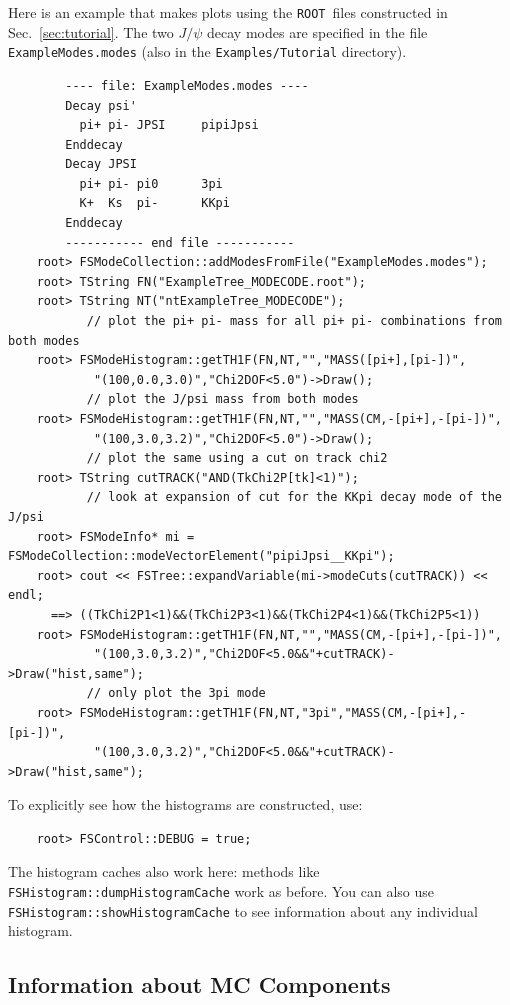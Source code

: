 \documentclass[11pt]{article}
\newcommand{\ROOT}{{\tt ROOT}}
\begin{document}
Here is an example that makes plots using the \ROOT\ files constructed in Sec.~\ref{sec:tutorial}.  The two $J/\psi$ decay modes are specified in the file {\tt ExampleModes.modes} (also in the {\tt Examples/Tutorial} directory).  
\begin{verbatim}
        ---- file: ExampleModes.modes ----
        Decay psi'
          pi+ pi- JPSI     pipiJpsi
        Enddecay
        Decay JPSI
          pi+ pi- pi0      3pi
          K+  Ks  pi-      KKpi
        Enddecay
        ----------- end file -----------
    root> FSModeCollection::addModesFromFile("ExampleModes.modes");
    root> TString FN("ExampleTree_MODECODE.root");  
    root> TString NT("ntExampleTree_MODECODE");
           // plot the pi+ pi- mass for all pi+ pi- combinations from both modes  
    root> FSModeHistogram::getTH1F(FN,NT,"","MASS([pi+],[pi-])",
            "(100,0.0,3.0)","Chi2DOF<5.0")->Draw();
           // plot the J/psi mass from both modes  
    root> FSModeHistogram::getTH1F(FN,NT,"","MASS(CM,-[pi+],-[pi-])",
            "(100,3.0,3.2)","Chi2DOF<5.0")->Draw();
           // plot the same using a cut on track chi2
    root> TString cutTRACK("AND(TkChi2P[tk]<1)");
           // look at expansion of cut for the KKpi decay mode of the J/psi
    root> FSModeInfo* mi = FSModeCollection::modeVectorElement("pipiJpsi__KKpi");
    root> cout << FSTree::expandVariable(mi->modeCuts(cutTRACK)) << endl;
      ==> ((TkChi2P1<1)&&(TkChi2P3<1)&&(TkChi2P4<1)&&(TkChi2P5<1))
    root> FSModeHistogram::getTH1F(FN,NT,"","MASS(CM,-[pi+],-[pi-])",
            "(100,3.0,3.2)","Chi2DOF<5.0&&"+cutTRACK)->Draw("hist,same");
           // only plot the 3pi mode
    root> FSModeHistogram::getTH1F(FN,NT,"3pi","MASS(CM,-[pi+],-[pi-])",
            "(100,3.0,3.2)","Chi2DOF<5.0&&"+cutTRACK)->Draw("hist,same");
\end{verbatim}

To explicitly see how the histograms are constructed, use:
\begin{verbatim}
    root> FSControl::DEBUG = true;
\end{verbatim}

The histogram caches also work here:  methods like {\tt FSHistogram::dumpHistogramCache} work as before.
You can also use {\tt FSHistogram::showHistogramCache} to see information about any individual histogram.

\subsection{Information about MC Components}
\label{sec:mccomponents}
\end{document}
